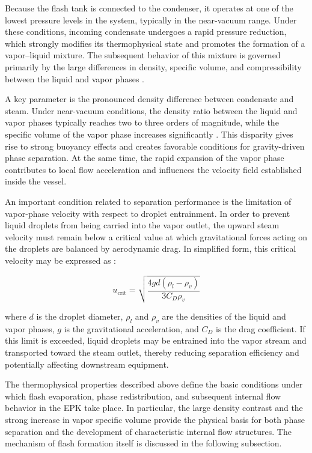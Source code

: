 Because the flash tank is connected to the condenser, it operates at one of the lowest pressure levels in the system, typically in the near-vacuum range. Under these conditions, incoming condensate undergoes a rapid pressure reduction, which strongly modifies its thermophysical state and promotes the formation of a vapor--liquid mixture. The subsequent behavior of this mixture is governed primarily by the large differences in density, specific volume, and compressibility between the liquid and vapor phases \cite{IAPWS_IF97, Ishii_Hibiki}.

A key parameter is the pronounced density difference between condensate and steam. Under near-vacuum conditions, the density ratio between the liquid and vapor phases typically reaches two to three orders of magnitude, while the specific volume of the vapor phase increases significantly \cite{IAPWS_IF97}. This disparity gives rise to strong buoyancy effects and creates favorable conditions for gravity-driven phase separation. At the same time, the rapid expansion of the vapor phase contributes to local flow acceleration and influences the velocity field established inside the vessel.

An important condition related to separation performance is the limitation of vapor-phase velocity with respect to droplet entrainment. In order to prevent liquid droplets from being carried into the vapor outlet, the upward steam velocity must remain below a critical value at which gravitational forces acting on the droplets are balanced by aerodynamic drag. In simplified form, this critical velocity may be expressed as \cite{Ishii_Hibiki}:

\begin{equation}
u_{\text{crit}} = \sqrt{\frac{4 g d (\rho_l - \rho_v)}{3 C_D \rho_v}}
\end{equation}

where $d$ is the droplet diameter, $\rho_l$ and $\rho_v$ are the densities of the liquid and vapor phases, $g$ is the gravitational acceleration, and $C_D$ is the drag coefficient. If this limit is exceeded, liquid droplets may be entrained into the vapor stream and transported toward the steam outlet, thereby reducing separation efficiency and potentially affecting downstream equipment.

The thermophysical properties described above define the basic conditions under which flash evaporation, phase redistribution, and subsequent internal flow behavior in the EPK take place. In particular, the large density contrast and the strong increase in vapor specific volume provide the physical basis for both phase separation and the development of characteristic internal flow structures. The mechanism of flash formation itself is discussed in the following subsection.

